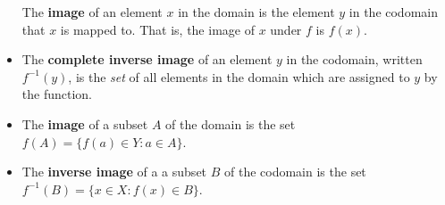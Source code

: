 \documentclass[10pt,]{book}
\newcommand{\terminology}[1]{\textbf{#1}}
\theoremstyle{plain}
\theoremstyle{definition}
\theoremstyle{definition}
\theoremstyle{definition}
\theoremstyle{definition}
\numberwithin{equation}{chapter}
\def\inv{^{-1}}
\def\st{:}
\begin{document}
\begin{assemblage}
\begin{itemize}[label=\textbullet]
The \terminology{image} of an element \(x\) in the domain is the element \(y\) in the codomain that \(x\) is mapped to.  That is, the image of \(x\) under \(f\) is  \(f(x)\).%
\item{}\hypertarget{p-1675}{}%
The \terminology{complete inverse image} of an element \(y\) in the codomain, written \(f\inv(y)\), is the \emph{set} of all elements in the domain which are assigned to \(y\) by the function.%
\item{}\hypertarget{p-1676}{}%
The \terminology{image} of a subset \(A\) of the domain is the set \(f(A) = \{f(a) \in Y \st a \in A\}\).%
\item{}\hypertarget{p-1677}{}%
The \terminology{inverse image} of a a subset \(B\) of the codomain is the set \(f\inv(B) = \{x \in X \st f(x) \in B\}\).%
\end{itemize}
%
\end{assemblage}
\typeout{************************************************}
\typeout{************************************************}
\end{document}
